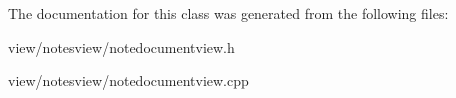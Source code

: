 The documentation for this class was generated from the following files\-:\begin{DoxyCompactItemize}
\item 
view/notesview/notedocumentview.\-h\item 
view/notesview/notedocumentview.\-cpp\end{DoxyCompactItemize}
